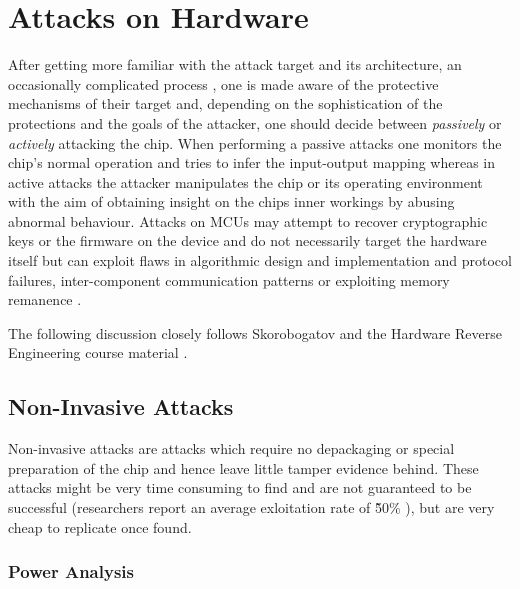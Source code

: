 \section{Attacks on Hardware}
\label{sec:curr_attacks}
After getting more familiar with the attack target and its architecture, an occasionally complicated process \citep{sergei:thesis} \citep{hwre},  one is made aware of the protective mechanisms of their target and, depending on the sophistication of the protections and the goals of the attacker, one should decide between \emph{passively} or \emph{actively} attacking the chip. When performing a passive attacks one monitors the chip's normal operation and tries to infer the input-output mapping whereas in active attacks the attacker manipulates the chip or its operating environment with the aim of obtaining insight on the chips inner workings by abusing abnormal behaviour. Attacks on MCUs may attempt to recover cryptographic keys or the firmware on the device and do not necessarily target the hardware itself but can exploit flaws in algorithmic design and implementation and protocol failures, inter-component communication patterns \citep{anderson:cautionary_note} \citep{kocher:DPA} or exploiting memory remanence \citep{sergei:thesis} \citep{gutman:memory_remanence}.

The following discussion closely follows Skorobogatov \citep{sergei:thesis} and the Hardware Reverse Engineering course material \citep{hwre}.

	\subsection{Non-Invasive Attacks}
	Non-invasive attacks are attacks which require no depackaging or special preparation of the chip and hence leave little tamper evidence behind. These attacks might be very time consuming to find and are not guaranteed to be successful (researchers report an average exloitation rate of \~50\% \citep{sergei:thesis} \citep{glitches_paper}), but are very cheap to replicate once found.
	
	\subsubsection{Power Analysis}	
	\label{subsubsec:power_analysis}

